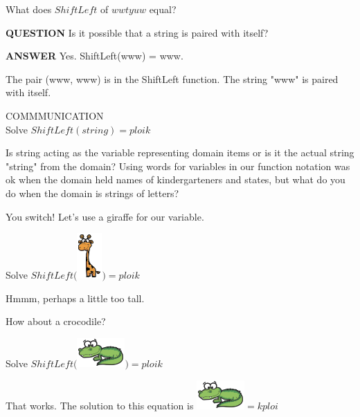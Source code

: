 \documentclass{ximera}
\begin{document}
\begin{question}
What does $ShiftLeft$ of $wwtyuw$ equal?
\begin{multipleChoice}
\end{multipleChoice}
\end{question}


\begin{dialogue}
\item[\textbf{QUESTION}] Is it possible that a string is paired with itself?

\item[\textbf{ANSWER}] Yes. ShiftLeft(www) = www.  
\end{dialogue}
The pair (www, www) is in the ShiftLeft function. The string "www" is paired with itself.
\quad \\







\begin{remark} COMMMUNICATION \\
Solve $ShiftLeft(string) = ploik$ 


Is string acting as the variable representing domain items or is it the actual string "string" from the domain? Using words for variables in our function notation was ok when the domain held names of kindergarteners and states, but what do you do when the domain is strings of letters?

You switch!  Let's use a giraffe for our variable.

Solve $ShiftLeft($\includegraphics{pics/giraffe.png}$) = ploik$

Hmmm, perhaps a little too tall.

How about a crocodile?

Solve $ShiftLeft($\includegraphics{pics/alligator.png}$) = ploik$

That works.  The solution to this equation is 
\includegraphics{pics/alligator.png}$ = kploi$

\end{remark}
\end{document}

